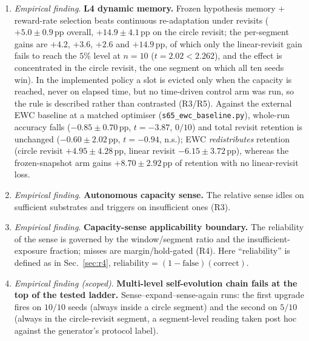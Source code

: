 \documentclass[preprint,12pt]{elsarticle}
\begin{document}
\begin{enumerate}[label=\arabic*.]
SD) and is
inverted-U in coupling over the eight-point grid
$\kappa\in\{10,15,20,25,30,35,40,45\}$: the sampled maximum lies at
$\kappa=20$ ($0.1185\pm0.031$) with the deployed $\kappa=25$
($0.0995\pm0.036$) within one seed SD of it, the margin collapses at
$\kappa\geq30$, and on the $2$-D circle the maximum stays at $\kappa=25$;
the deployed value is therefore \emph{not} presented as the capacity peak and
no optimal coupling is claimed (R2).
\item \emph{Empirical finding}. \textbf{L4 dynamic memory.} Frozen hypothesis memory + reward-rate
selection beats continuous re-adaptation under revisits ($+5.0\pm0.9$\,pp
overall, $+14.9\pm4.1$\,pp on the circle revisit; the per-segment gains are
$+4.2$, $+3.6$, $+2.6$ and $+14.9$\,pp, of which only the linear-revisit gain
fails to reach the $5\%$ level at $n=10$ ($t=2.02<2.262$), and the effect is
concentrated in the circle revisit, the one segment on which all ten seeds
win). In the implemented policy a slot is evicted only when the capacity is
reached, never on elapsed time, but no time-driven control arm was run, so the
rule is described rather than contrasted (R3/R5). Against the external EWC
baseline at a matched optimiser (\texttt{s65\_ewc\_baseline.py}), whole-run
accuracy falls ($-0.85\pm0.70$\,pp, $t=-3.87$, $0/10$) and total revisit
retention is unchanged ($-0.60\pm2.02$\,pp, $t=-0.94$, n.s.); EWC
\emph{redistributes} retention (circle revisit $+4.95\pm4.28$\,pp, linear
revisit $-6.15\pm3.72$\,pp), whereas the frozen-snapshot arm gains
$+8.70\pm2.92$\,pp of retention with no linear-revisit loss.
\item \emph{Empirical finding}. \textbf{Autonomous capacity sense.} The relative sense idles on
sufficient substrates and triggers on insufficient ones (R3).
\item \emph{Empirical finding}. \textbf{Capacity-sense applicability boundary.} The reliability of
the sense is governed by the window/segment ratio and the
insufficient-exposure fraction; misses are margin/hold-gated (R4). Here
``reliability'' is defined as in Sec.~\ref{sec:r4},
$\text{reliability}=(1-\text{false})(\text{correct})$.
\item \emph{Empirical finding (scoped)}. \textbf{Multi-level self-evolution chain fails at the top of the tested ladder.} Sense--expand--sense-again
runs: the first upgrade fires on $10/10$ seeds (always inside a circle
segment) and the second on $5/10$ (always in the circle-revisit segment, a
segment-level reading taken post hoc against the generator's protocol label).

\end{enumerate}
\end{document}
